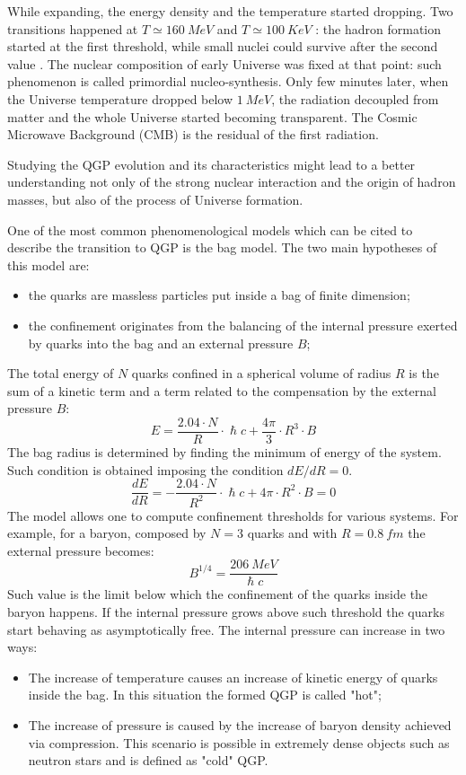 While expanding, the energy density and the temperature started dropping.
Two transitions happened at $T\simeq160\ MeV$ and $T\simeq100\ KeV$ \cite{Kapoyannis:2017hcz}: the hadron formation started at the first threshold, while small nuclei could survive after the second value \cite{Dumitru:2000sc}.
The nuclear composition of early Universe was fixed at that point: such phenomenon is called primordial nucleo-synthesis.
Only few minutes later, when the Universe temperature dropped below $1\ MeV$, the radiation decoupled from matter and the whole Universe started becoming transparent.
The Cosmic Microwave Background (CMB) is the residual of the first radiation.

Studying the QGP evolution and its characteristics might lead to a better understanding not only of the strong nuclear interaction and the origin of hadron masses, but also of the process of Universe formation.

One of the most common phenomenological models which can be cited to describe the transition to QGP is the bag model.
The two main hypotheses of this model are:
\begin{itemize}
    \item the quarks are massless particles put inside a bag of finite dimension;
    \item the confinement originates from the balancing of the internal pressure exerted by quarks into the bag and an external pressure $B$;
\end{itemize}
The total energy of $N$ quarks confined in a spherical volume of radius $R$ is the sum of a kinetic term and a term related to the compensation by the external pressure $B$:
\begin{equation}
    E=\frac{2.04\cdot N}{R}\cdot \hslash c + \frac{4\pi}{3}\cdot R^3\cdot B
\end{equation}
The bag radius is determined by finding the minimum of energy of the system.
Such condition is obtained imposing the condition $dE/dR=0$.
\begin{equation}
\frac{dE}{dR}=-\frac{2.04\cdot N}{R^2}\cdot \hslash c + 4\pi\cdot R^2\cdot B = 0
\end{equation}
The model allows one to compute confinement thresholds for various systems.
For example, for a baryon, composed by $N=3$ quarks and with $R=0.8\ fm$ the external pressure becomes:
\begin{equation}
B^{1/4} = \frac{206\ MeV}{\hslash c}
\end{equation}
Such value is the limit below which the confinement of the quarks inside the baryon happens.
If the internal pressure grows above such threshold the quarks start behaving as asymptotically free.
The internal pressure can increase in two ways:
\begin{itemize}
\item The increase of temperature causes an increase of kinetic energy of quarks inside the bag. In this situation the formed QGP is called "hot";
\item The increase of pressure is caused by the increase of baryon density achieved via compression. This scenario is possible in extremely dense objects such as neutron stars and is defined as "cold" QGP.
\end{itemize}

